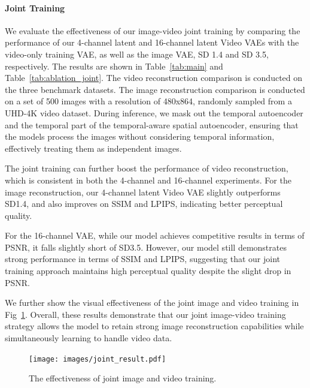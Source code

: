 \paragraph{Joint Training}
We evaluate the effectiveness of our image-video joint training by comparing the performance of our 4-channel latent and 16-channel latent Video VAEs with the video-only training VAE, as well as the image VAE,  SD 1.4 and SD 3.5, respectively. The results are shown in Table~\ref{tab:main} and Table~\ref{tab:ablation_joint}. The video reconstruction comparison is conducted on the three benchmark datasets. The image reconstruction comparison is conducted on a set of 500 images with a resolution of 480x864, randomly sampled from a UHD-4K video dataset. 
During inference, we mask out the temporal autoencoder and the temporal part of the temporal-aware spatial autoencoder, ensuring that the models process the images without considering temporal information, effectively treating them as independent images.

The joint training can further boost the performance of video reconstruction, which is consistent in both the 4-channel and 16-channel experiments. 
For the image reconstruction, our 4-channel latent Video VAE slightly outperforms SD1.4, and also improves on SSIM and LPIPS, indicating better perceptual quality.

For the 16-channel VAE, while our model achieves competitive results in terms of PSNR, it falls slightly short of SD3.5. However, our model still demonstrates strong performance in terms of SSIM and LPIPS, suggesting that our joint training approach maintains high perceptual quality despite the slight drop in PSNR.

We further show the visual effectiveness of the joint image and video training in Fig~\ref{fig:joint}. Overall, these results demonstrate that our joint image-video training strategy allows the model to retain strong image reconstruction capabilities while simultaneously learning to handle video data.

\begin{figure}[t]
\centering
\texttt{[image: images/joint\_result.pdf]}
\caption{The effectiveness of joint image and video training.   
}
\label{fig:joint}
\vspace{-5mm}
\end{figure}


